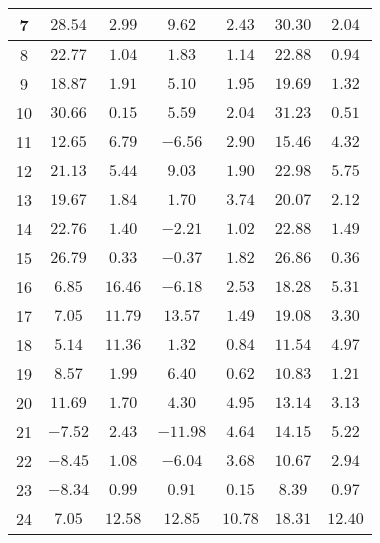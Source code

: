 \begin{table}[H]
\begin{tabular}{|c|c|c|c|c|c|c|}
                        7   &   $28.54$  &  $2.99$   &  $9.62$    &  $2.43$   &  $30.30$  & $2.04$  \\ \hline
                        8   &   $22.77$  &  $1.04$   &  $1.83$    &  $1.14$   &  $22.88$  & $0.94$  \\ \hline
                        9   &   $18.87$  &  $1.91$   &  $5.10$    &  $1.95$   &  $19.69$  & $1.32$  \\ \hline
                        10  &   $30.66$  &  $0.15$   &  $5.59$    &  $2.04$   &  $31.23$  & $0.51$  \\ \hline
                        11  &   $12.65$  &  $6.79$   &  $-6.56$   &  $2.90$   &  $15.46$  & $4.32$  \\ \hline
                        12  &   $21.13$  &  $5.44$   &  $9.03$    &  $1.90$   &  $22.98$  & $5.75$  \\ \hline
                        13  &   $19.67$  &  $1.84$   &  $1.70$    &  $3.74$   &  $20.07$  & $2.12$  \\ \hline
                        14  &   $22.76$  &  $1.40$   &  $-2.21$   &  $1.02$   &  $22.88$  & $1.49$  \\ \hline
                        15  &   $26.79$  &  $0.33$   &  $-0.37$   &  $1.82$   &  $26.86$  & $0.36$  \\ \hline
                        16  &   $6.85$   &  $16.46$  &  $-6.18$   &  $2.53$   &  $18.28$  & $5.31$  \\ \hline
                        17  &   $7.05$   &  $11.79$  &  $13.57$   &  $1.49$   &  $19.08$  & $3.30$  \\ \hline
                        18  &   $5.14$   &  $11.36$  &  $1.32$    &  $0.84$   &  $11.54$  & $4.97$  \\ \hline
                        19  &   $8.57$   &  $1.99$   &  $6.40$    &  $0.62$   &  $10.83$  & $1.21$  \\ \hline
                        20  &   $11.69$  &  $1.70$   &  $4.30$    &  $4.95$   &  $13.14$  & $3.13$  \\ \hline
                        21  &   $-7.52$  &  $2.43$   &  $-11.98$  &  $4.64$   &  $14.15$  & $5.22$  \\ \hline
                        22  &   $-8.45$  &  $1.08$   &  $-6.04$   &  $3.68$   &  $10.67$  & $2.94$  \\ \hline
                        23  &   $-8.34$  &  $0.99$   &  $0.91$    &  $0.15$   &  $8.39$   & $0.97$  \\ \hline
                        24  &   $7.05$   &  $12.58$  &  $12.85$   &  $10.78$  &  $18.31$  & $12.40$  \\ \hline

\end{tabular}
\end{table}
